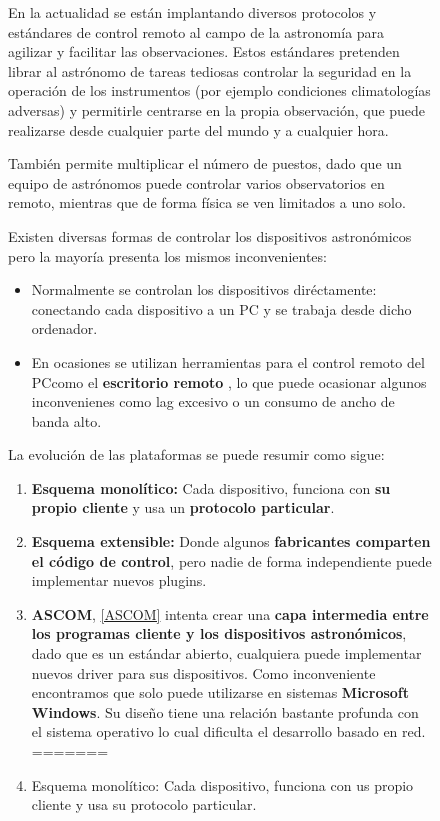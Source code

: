 \begin{itemize}
\begin{itemize}
\begin{figure}[h]
En la actualidad se están implantando diversos protocolos y estándares de control remoto al campo de la astronomía para agilizar y facilitar las observaciones. Estos estándares pretenden librar al astrónomo de tareas tediosas controlar la seguridad en la operación de los instrumentos (por ejemplo condiciones climatologías adversas) y permitirle centrarse en la propia observación, que puede realizarse desde cualquier parte del mundo y a cualquier hora.

También permite multiplicar el número de puestos, dado que un equipo de astrónomos puede controlar varios observatorios en remoto, mientras que de forma física se ven limitados a uno solo. 

Existen diversas formas de controlar los dispositivos astronómicos pero la mayoría presenta los mismos inconvenientes:

\begin{itemize}
	\item Normalmente se controlan los dispositivos diréctamente: conectando cada dispositivo a un PC y se trabaja desde dicho ordenador.
	\item En ocasiones se utilizan herramientas para el control remoto del PCcomo el \textbf{escritorio remoto} \cite{escritorio_remoto}, lo que puede ocasionar algunos inconvenienes como lag excesivo o un consumo de ancho de banda alto.
\end{itemize}

La evolución de las plataformas se puede resumir como sigue:

\begin{enumerate}
<<<<<<< HEAD
\item \textbf{Esquema monolítico:} Cada dispositivo, funciona con \textbf{su propio cliente} y usa un \textbf{protocolo particular}.

\item \textbf{Esquema extensible:} Donde algunos \textbf{fabricantes comparten el código de control}, pero nadie de forma independiente puede implementar nuevos plugins.

\item \textbf{ASCOM}, \ref{ASCOM} intenta crear una \textbf{capa intermedia entre los programas cliente y los dispositivos astronómicos}, dado que es un estándar abierto, cualquiera puede implementar nuevos driver para sus dispositivos. Como inconveniente encontramos que solo puede utilizarse en sistemas \textbf{Microsoft Windows}. Su diseño tiene una relación bastante profunda con el sistema operativo lo cual dificulta el desarrollo basado en red. \cite{ascom}
=======
\item Esquema monolítico:  Cada dispositivo, funciona con us propio cliente y usa su protocolo particular.


\end{enumerate}
\end{figure}
\end{itemize}
\end{itemize}
